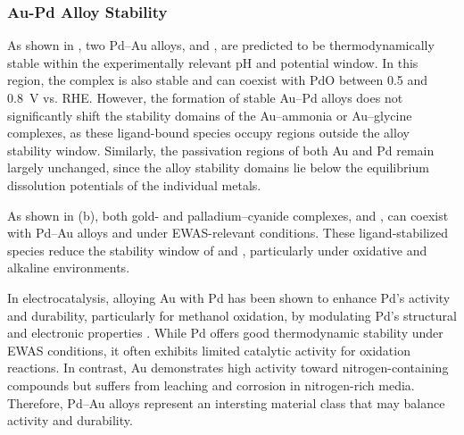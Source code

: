 \documentclass[journal=jacsat,manuscript=article]{achemso}
\begin{document}
\subsubsection{Au-Pd Alloy Stability}

As shown in , two Pd–Au alloys,  and , are predicted to be thermodynamically stable within the experimentally relevant pH and potential window. In this region, the \ce{[Au(NH3)_2]^+} complex is also stable and can coexist with PdO between 0.5 and 0.8~V vs. RHE. However, the formation of stable Au–Pd alloys does not significantly shift the stability domains of the Au–ammonia or Au–glycine complexes, as these ligand-bound species occupy regions outside the alloy stability window. Similarly, the passivation regions of both Au and Pd remain largely unchanged, since the alloy stability domains lie below the equilibrium dissolution potentials of the individual metals.

As shown in (b), both gold- and palladium–cyanide complexes,  and , can coexist with Pd–Au alloys and  under EWAS-relevant conditions. These ligand-stabilized species reduce the stability window of  and , particularly under oxidative and alkaline environments.

In electrocatalysis, alloying Au with Pd has been shown to enhance Pd’s activity and durability, particularly for methanol oxidation, by modulating Pd’s structural and electronic properties \cite{Hoshi2006StructuralPalladium, Kelly2018UnderstandingReaction, Aota2023RevealingTomography}. While Pd offers good thermodynamic stability under EWAS conditions, it often exhibits limited catalytic activity for oxidation reactions. In contrast, Au demonstrates high activity toward nitrogen-containing compounds but suffers from leaching and corrosion in nitrogen-rich media. Therefore, Pd–Au alloys represent an intersting material class that may balance activity and durability.
\end{document}
